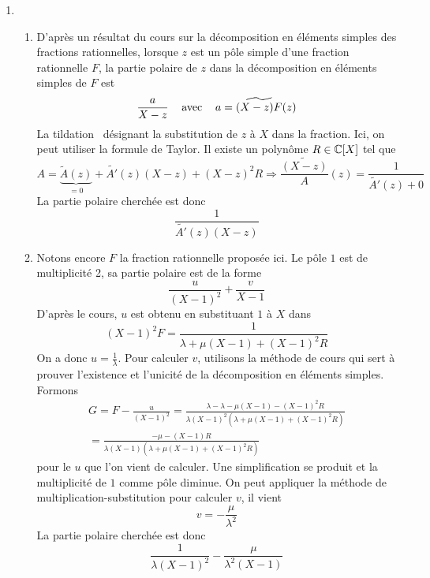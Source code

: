 \begin{enumerate}
\item \begin{enumerate}
 \item D'après un résultat du cours sur la décomposition en éléments simples des fractions rationnelles, lorsque $z$ est un pôle simple d'une fraction rationnelle $F$, la partie polaire de $z$ dans la décomposition en éléments simples de $F$ est 
\begin{displaymath}
 \frac{a}{X-z} \hspace{0.3cm}\text{ avec } \hspace{0.3cm} a=\widetilde{(X-z)F}(z)
\end{displaymath}
La \og tildation\fg~ désignant la substitution de $z$ à $X$ dans la fraction. Ici, on peut utiliser la formule de Taylor. Il existe un polynôme $R\in \mathbb{C}[X]$ tel que
\begin{displaymath}
 A = \underset{=0}{\underbrace{\widetilde{A}(z)}} + \widetilde{A'}(z)(X-z) + (X-z)^2R \Rightarrow 
 \widetilde{\frac{(X-z)}{A} }(z) = \frac{1}{\widetilde{A'}(z)+0} 
\end{displaymath}
La partie polaire cherchée est donc
\begin{displaymath}
 \frac{1}{\widetilde{A'}(z)(X-z)}
\end{displaymath}

\item Notons encore $F$ la fraction rationnelle proposée ici. Le pôle $1$ est de multiplicité 2, sa partie polaire est de la forme
\begin{displaymath}
 \frac{u}{(X-1)^2}+\frac{v}{X-1}
\end{displaymath}
D'après le cours, $u$ est obtenu en substituant $1$ à $X$ dans
\begin{displaymath}
 (X-1)^2F = \frac{1}{\lambda + \mu(X-1)+(X-1)^2R}
\end{displaymath}
On a donc $u=\frac{1}{\lambda}$.\newline
Pour calculer $v$, utilisons la méthode de cours qui sert à prouver l'existence et l'unicité de la décomposition en éléments simples. Formons
\begin{multline*}
 G= F-\frac{u}{(X-1)^2} = \frac{\lambda - \lambda -\mu(X-1)-(X-1)^2R}{\lambda(X-1)^2(\lambda +\mu(X-1)+(X-1)^2R)} \\
= \frac{-\mu -(X-1)R}{\lambda(X-1)(\lambda +\mu(X-1)+(X-1)^2R)}
\end{multline*}
pour le $u$ que l'on vient de calculer. Une simplification se produit et la multiplicité de $1$ comme pôle diminue. On peut appliquer la méthode de multiplication-substitution pour calculer $v$, il vient
\begin{displaymath}
 v=-\frac{\mu}{\lambda^2}
\end{displaymath}
La partie polaire cherchée est donc
\begin{displaymath}
 \frac{1}{\lambda(X-1)^2}-\frac{\mu}{\lambda^2(X-1)}
\end{displaymath}
\end{enumerate}
\end{enumerate}

